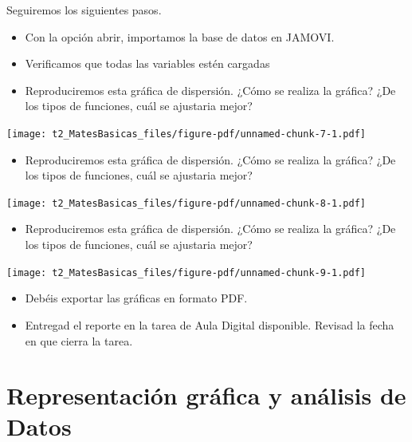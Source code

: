 \documentclass[
  letterpaper,
  DIV=11,
  numbers=noendperiod]{scrreprt}
\providecommand{\tightlist}{%
  \setlength{\itemsep}{0pt}\setlength{\parskip}{0pt}}\usepackage{longtable,booktabs,array}
\begin{document}
Seguiremos los siguientes pasos.

\begin{itemize}
\item
  Con la opción abrir, importamos la base de datos en JAMOVI.
\item
  Verificamos que todas las variables estén cargadas
\item
  Reproduciremos esta gráfica de dispersión. ¿Cómo se realiza la
  gráfica? ¿De los tipos de funciones, cuál se ajustaria mejor?
\end{itemize}

\begin{center}
\texttt{[image: t2\_MatesBasicas\_files/figure-pdf/unnamed-chunk-7-1.pdf]}
\end{center}

\begin{itemize}
\tightlist
\item
  Reproduciremos esta gráfica de dispersión. ¿Cómo se realiza la
  gráfica? ¿De los tipos de funciones, cuál se ajustaria mejor?
\end{itemize}

\begin{center}
\texttt{[image: t2\_MatesBasicas\_files/figure-pdf/unnamed-chunk-8-1.pdf]}
\end{center}

\begin{itemize}
\tightlist
\item
  Reproduciremos esta gráfica de dispersión. ¿Cómo se realiza la
  gráfica? ¿De los tipos de funciones, cuál se ajustaria mejor?
\end{itemize}

\begin{center}
\texttt{[image: t2\_MatesBasicas\_files/figure-pdf/unnamed-chunk-9-1.pdf]}
\end{center}

\begin{itemize}
\tightlist
\item
  Debéis exportar las gráficas en formato PDF.
\item
  Entregad el reporte en la tarea de Aula Digital disponible. Revisad la
  fecha en que cierra la tarea.
\end{itemize}


\chapter{Representación gráfica y análisis de
Datos}\label{representaciuxf3n-gruxe1fica-y-anuxe1lisis-de-datos}
\end{document}

